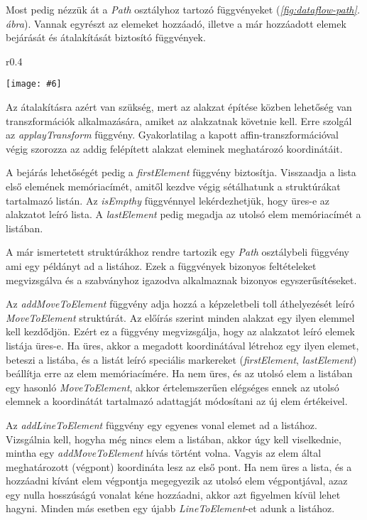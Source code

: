 \documentclass[12pt]{report}
\makeatletter
\theoremstyle{definition}
\newcommand{\func}[1]{{\textsl{#1}}}
\newcommand{\melyikoldalra}{r}
\newlength{\Xoffset}
\newlength{\Yoffset}
\newcommand*{\setpdfoffset}[2]{%
  \setlength{\Xoffset}{#1}%
  \setlength{\Yoffset}{#2}%
}
\newcommand*{\setviewport}[4]{%
  \def\x@viewport{%
    {\the\dimexpr#1-\Xoffset}
    {\the\dimexpr#2-\Yoffset}
    {\the\dimexpr#3-\Xoffset}
    {\the\dimexpr#4-\Yoffset}%
  }%
}
\newcommand{\includegraphicskivagas}[6]{
    \setpdfoffset{0pt}{0pt}
    \setviewport{#1}{#2}{#3}{#4}
    \texttt{[image: \#6]}
}
\newcommand{\includedataflowkivagas}[5]{
    \includegraphicskivagas{#1}{#2}{#3}{#4}{scale=0.6,#5}
    {img/built/dataflow_eps}
}
\makeatother
\begin{document}
Most pedig nézzük át a \func{Path} osztályhoz tartozó függvényeket
(\emph{\ref{fig:dataflow-path}. ábra}). Vannak egyrészt az elemeket
hozzáadó, illetve a már hozzáadott elemek bejárását és átalakítását biztosító
függvények.

  \begin{wrapfigure}{\melyikoldalra}{0.4\textwidth}
    \begin{center}
      \includedataflowkivagas{153pt}{355pt}{345pt}{595pt}{}
    \end{center}
    \caption{\label{fig:dataflow-path} A belső Path API részei \\ (Részlet
    \az+\emph{\ref{appendix:dataflow}. folyamatábrából}.)}
  \end{wrapfigure}

Az átalakításra azért van szükség, mert az alakzat építése közben lehetőség van
transzformációk alkalmazására, amiket az alakzatnak követnie kell. Erre szolgál
az \func{applayTransform} függvény. Gyakorlatilag a kapott
affin-transzformációval végig szorozza az addig felépített alakzat eleminek
meghatározó koordinátáit.

A bejárás lehetőségét pedig a \func{firstElement} függvény biztosítja.
Visszaadja a lista első elemének memóriacímét, amitől kezdve végig sétálhatunk
a struktúrákat tartalmazó listán. Az \func{isEmpthy} függvénnyel
lekérdezhetjük, hogy üres-e az alakzatot leíró lista. A \func{lastElement}
pedig megadja az utolsó elem memóriacímét a listában.

A már ismertetett struktúrákhoz rendre tartozik egy \func{Path} osztálybeli
függvény ami egy példányt ad a listához. Ezek a függvények bizonyos
feltételeket megvizsgálva és a szabványhoz igazodva alkalmaznak bizonyos
egyszerűsítéseket.

Az \func{addMoveToElement} függvény adja hozzá a képzeletbeli toll áthelyezését
leíró \func{MoveToElement} struktúrát. Az előírás szerint minden alakzat egy
ilyen elemmel kell kezdődjön. Ezért ez a függvény megvizsgálja, hogy az
alakzatot leíró elemek listája üres-e. Ha üres, akkor a megadott koordinátával
létrehoz egy ilyen elemet, beteszi a listába, és a listát leíró speciális
markereket (\func{firstElement}, \func{lastElement}) beállítja erre az elem
memóriacímére. Ha nem üres, és az utolsó elem a listában egy hasonló
\func{MoveToElement}, akkor értelemszerűen elégséges ennek az utolsó elemnek a
koordinátát tartalmazó adattagját módosítani az új elem értékeivel.

Az \func{addLineToElement} függvény egy egyenes vonal elemet ad a listához.
Vizsgálnia kell, hogyha még nincs elem a listában, akkor úgy kell viselkednie,
mintha egy \func{addMoveToElement} hívás történt volna. Vagyis az elem által
meghatározott (végpont) koordináta lesz az első pont. Ha nem üres a lista, és a
hozzáadni kívánt elem végpontja megegyezik az utolsó elem végpontjával, azaz
egy nulla hosszúságú vonalat kéne hozzáadni, akkor azt figyelmen kívül lehet
hagyni. Minden más esetben egy újabb \func{LineToElement}-et adunk a listához.
\end{document}
